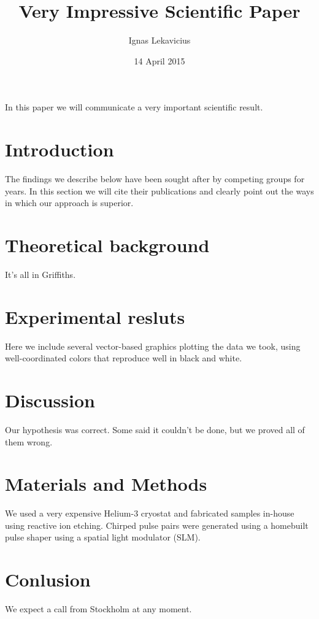 \documentclass[11pt]{amsart}
\title{Very Impressive Scientific Paper}
\author{Ignas Lekavicius}
\date{14 April 2015}
\begin{document}
\maketitle

In this paper we will communicate a very important scientific result.

\section{Introduction}

The findings we describe below have been sought after by competing groups
 for years. In this section we will cite their publications and clearly
 point out the ways in which our approach is superior.

\section{Theoretical background}

It's all in Griffiths.

\section{Experimental resluts}

Here we include several vector-based graphics plotting the data we
 took, using well-coordinated colors that reproduce well in black and 
white.

\section{Discussion}

Our hypothesis was correct. Some said it couldn't be done, but we 
proved all of them wrong.

\section{Materials and Methods}

We used a very expensive Helium-3 cryostat and fabricated samples 
in-house using reactive ion etching. Chirped pulse pairs were
 generated using a homebuilt pulse shaper using a spatial light
 modulator (SLM).

\section{Conlusion}

We expect a call from Stockholm at any moment.
\end{document}
